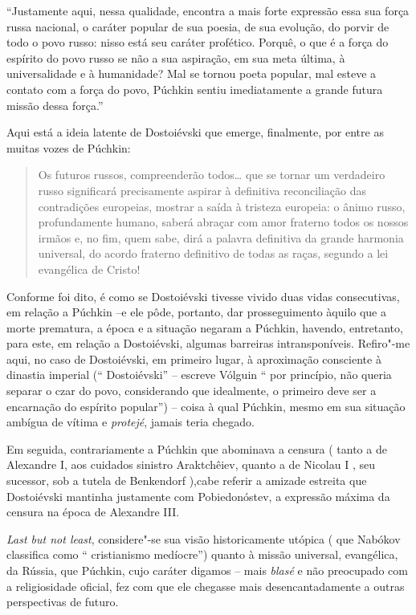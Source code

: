 ``Justamente aqui, nessa qualidade, encontra a mais forte expressão essa
sua força russa nacional, o caráter popular de sua poesia, de sua
evolução, do porvir de todo o povo russo: nisso está seu caráter
profético. Porquê, o que é a força do espírito do povo russo se não a
sua aspiração, em sua meta última, à universalidade e à humanidade? Mal
se tornou poeta popular, mal esteve a contato com a força do povo,
Púchkin sentiu imediatamente a grande futura missão dessa força.''

Aqui está a ideia latente de Dostoiévski que emerge, finalmente, por
entre as muitas vozes de Púchkin:

\begin{quote}
Os futuros russos, compreenderão todos\ldots{} que se tornar um verdadeiro
russo significará precisamente aspirar à definitiva reconciliação das
contradições europeias, mostrar a saída à tristeza europeia: o ânimo
russo, profundamente humano, saberá abraçar com amor fraterno todos os
nossos irmãos e, no fim, quem sabe, dirá a palavra definitiva da grande
harmonia universal, do acordo fraterno definitivo de todas as raças,
segundo a lei evangélica de Cristo!
\end{quote}

Conforme foi dito, é como se Dostoiévski tivesse vivido duas vidas
consecutivas, em relação a Púchkin --e ele pôde, portanto, dar
prosseguimento àquilo que a morte prematura, a época e a situação
negaram a Púchkin, havendo, entretanto, para este, em relação a
Dostoiévski, algumas barreiras intransponíveis. Refiro"-me aqui, no caso
de Dostoiévski, em primeiro lugar, à aproximação consciente à dinastia
imperial (`` Dostoiévski'' -- escreve Vólguin `` por princípio, não
queria separar o czar do povo, considerando que idealmente, o primeiro
deve ser a encarnação do espírito popular'') -- coisa à qual Púchkin,
mesmo em sua situação ambígua de vítima e \emph{protejé}, jamais teria
chegado.

Em seguida, contrariamente a Púchkin que abominava a censura ( tanto a
de Alexandre I, aos cuidados sinistro Araktchêiev, quanto a de Nicolau I
, seu sucessor, sob a tutela de Benkendorf ),cabe referir a amizade
estreita que Dostoiévski mantinha justamente com Pobiedonóstev, a
expressão máxima da censura na época de Alexandre III.

\emph{Last but not least}, considere"-se sua visão historicamente utópica
( que Nabókov classifica como `` cristianismo medíocre'') quanto à
missão universal, evangélica, da Rússia, que Púchkin, cujo caráter
digamos -- mais \emph{blasé} e não preocupado com a religiosidade
oficial, fez com que ele chegasse mais desencantadamente a outras
perspectivas de futuro.

